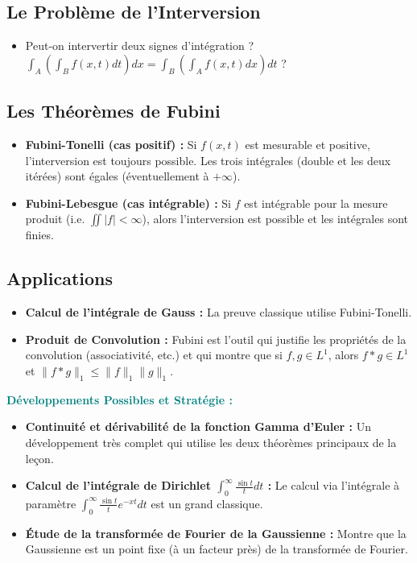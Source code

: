 \documentclass[12pt, a4paper, parskip=full]{report}
\theoremstyle{agregstyle}
\newenvironment{developpements}
  {\par\medskip\noindent\begin{oframed}\noindent\textbf{\textcolor{teal}{Développements Possibles et Stratégie :}}}
  {\end{oframed}\par\medskip}
\begin{document}
\subsection{Le Problème de l'Interversion}
\begin{itemize}
    \item Peut-on intervertir deux signes d'intégration ? $\int_A \left( \int_B f(x,t) dt \right) dx = \int_B \left( \int_A f(x,t) dx \right) dt$ ?
\end{itemize}
\subsection{Les Théorèmes de Fubini}
\begin{itemize}
    \item \textbf{Fubini-Tonelli (cas positif) :} Si $f(x,t)$ est mesurable et positive, l'interversion est toujours possible. Les trois intégrales (double et les deux itérées) sont égales (éventuellement à $+\infty$).
    \item \textbf{Fubini-Lebesgue (cas intégrable) :} Si $f$ est intégrable pour la mesure produit (i.e. $\iint |f| < \infty$), alors l'interversion est possible et les intégrales sont finies.
\end{itemize}
\subsection{Applications}
\begin{itemize}
    \item \textbf{Calcul de l'intégrale de Gauss :} La preuve classique utilise Fubini-Tonelli.
    \item \textbf{Produit de Convolution :} Fubini est l'outil qui justifie les propriétés de la convolution (associativité, etc.) et qui montre que si $f,g \in L^1$, alors $f*g \in L^1$ et $\|f*g\|_1 \le \|f\|_1 \|g\|_1$.
\end{itemize}

\begin{developpements}
    \begin{itemize}
        \item \textbf{Continuité et dérivabilité de la fonction Gamma d'Euler :} Un développement très complet qui utilise les deux théorèmes principaux de la leçon.
        \item \textbf{Calcul de l'intégrale de Dirichlet $\int_0^\infty \frac{\sin t}{t} dt$ :} Le calcul via l'intégrale à paramètre $\int_0^\infty \frac{\sin t}{t} e^{-xt} dt$ est un grand classique.
        \item \textbf{Étude de la transformée de Fourier de la Gaussienne :} Montre que la Gaussienne est un point fixe (à un facteur près) de la transformée de Fourier.
    \end{itemize}
\end{developpements}
\end{document}
